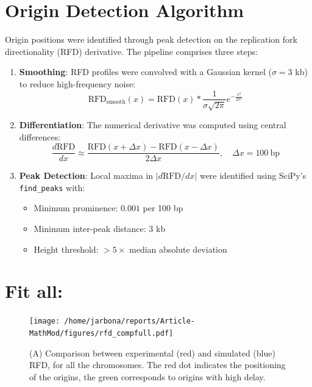 \documentclass[10pt,a4paper]{revtex4-2}
\begin{document}
\section{Origin Detection Algorithm}\label{app:origin_detect}

Origin positions were identified through peak detection on the replication fork directionality (RFD) derivative. The pipeline comprises three steps:

\begin{enumerate}
    \item \textbf{Smoothing}: RFD profiles were convolved with a Gaussian kernel ($\sigma=3$ kb) to reduce high-frequency noise:
    \begin{equation}
        \text{RFD}_{\text{smooth}}(x) = \text{RFD}(x) \ast \frac{1}{\sigma\sqrt{2\pi}}e^{-\frac{x^2}{2\sigma^2}}
    \end{equation}
    
    \item \textbf{Differentiation}: The numerical derivative was computed using central differences:
    \begin{equation}
        \frac{d\text{RFD}}{dx} \approx \frac{\text{RFD}(x+\Delta x) - \text{RFD}(x-\Delta x)}{2\Delta x}, \quad \Delta x = 100\ \text{bp}
    \end{equation}
    
    \item \textbf{Peak Detection}: Local maxima in $|d\text{RFD}/dx|$ were identified using SciPy's \texttt{find\_peaks} with:
    \begin{itemize}
        \item Minimum prominence: $0.001$ per 100 bp
        \item Minimum inter-peak distance: 3 kb
        \item Height threshold: $>5\times$ median absolute deviation
    \end{itemize}
\end{enumerate}


\section{Fit all:}

\begin{figure}
\texttt{[image: /home/jarbona/reports/Article-MathMod/figures/rfd\_compfull.pdf]}

\caption{(A) Comparison between experimental (red) and simulated (blue) RFD, for all the chromosomes. The red dot indicates the positioning of the origins, the green corresponds to origins with high delay.}\label{fig:fit_rfd_all}
\end{figure}
\end{document}
